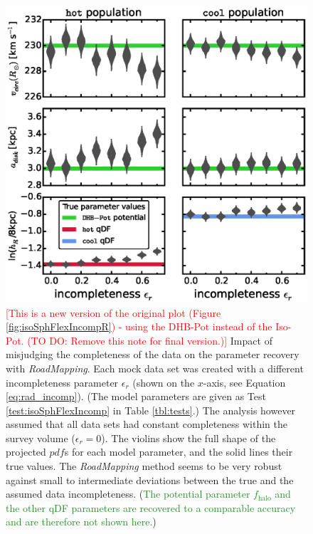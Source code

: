 \documentclass[iop,revtex4]{emulateapj}
\newcommand{\pdf}{\ensuremath{pdf}}
\newcommand{\RM}{{\sl RoadMapping}}
\newcommand{\NEW}[1]{\textcolor{ForestGreen}{#1}}
\newcommand{\NOTE}[1]{\textcolor{Red}{#1}}
\newcommand{\OLD}[1]{}
\begin{document}
\begin{figure}[!htbp]
\centering
\includegraphics[width=\columnwidth]{figs/MWbdhIncompR_violins.eps}
\caption{\NOTE{[This is a new version of the original plot (Figure \ref{fig:isoSphFlexIncompR}) - using the DHB-Pot instead of the Iso-Pot. (TO DO: Remove this note for final version.)]}  Impact of misjudging the completeness of the data on the parameter recovery with \RM{}. Each mock data set was created with a different incompleteness parameter $\epsilon_r$ (shown on the $x$-axis, see Equation \eqref{eq:rad_incomp}). (The model parameters are given as Test \ref{test:isoSphFlexIncomp} in Table \ref{tbl:tests}.) The analysis however assumed that all data sets had constant completeness within the survey volume ($\epsilon_r = 0$). The violins show the full shape of the projected \pdf{}s for each model parameter, and the solid lines their true values. The \RM{} method seems to be very robust against small to intermediate deviations between the true and the assumed data incompleteness. (\NEW{The potential parameter $f_\text{halo}$ and the other qDF parameters are recovered to a comparable accuracy and are therefore not shown here.}\OLD{The qDF parameters not shown here exhibit a similar robustness as $h_R$.})} 
\label{fig:MWdhbIncompR_violins}
\end{figure}
\end{document}
